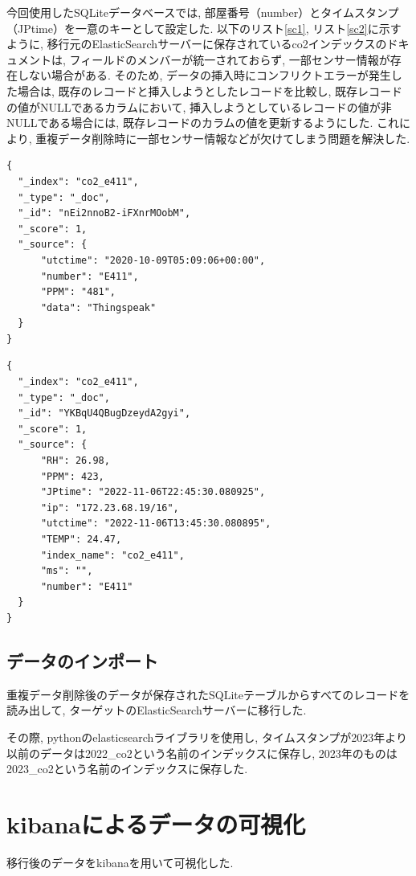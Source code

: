 今回使用したSQLiteデータベースでは, 部屋番号（number）とタイムスタンプ（JPtime）を一意のキーとして設定した. 以下のリスト\ref{sc1}, リスト\ref{sc2}に示すように, 移行元のElasticSearchサーバーに保存されているco2インデックスのドキュメントは, フィールドのメンバーが統一されておらず, 一部センサー情報が存在しない場合がある. そのため, データの挿入時にコンフリクトエラーが発生した場合は, 既存のレコードと挿入しようとしたレコードを比較し, 既存レコードの値がNULLであるカラムにおいて, 挿入しようとしているレコードの値が非NULLである場合には, 既存レコードのカラムの値を更新するようにした. これにより, 重複データ削除時に一部センサー情報などが欠けてしまう問題を解決した.

\begin{lstlisting}[caption=\_sourceフィールドのメンバー数が少ないドキュメント, label=sc1]
{
  "_index": "co2_e411",
  "_type": "_doc",
  "_id": "nEi2nnoB2-iFXnrMOobM",
  "_score": 1,
  "_source": {
      "utctime": "2020-10-09T05:09:06+00:00",
      "number": "E411",
      "PPM": "481",
      "data": "Thingspeak"
  }
}
  \end{lstlisting}

\begin{lstlisting}[caption=\_sourceフィールドのメンバー数が多いドキュメント, label=sc2]
{
  "_index": "co2_e411",
  "_type": "_doc",
  "_id": "YKBqU4QBugDzeydA2gyi",
  "_score": 1,
  "_source": {
      "RH": 26.98,
      "PPM": 423,
      "JPtime": "2022-11-06T22:45:30.080925",
      "ip": "172.23.68.19/16",
      "utctime": "2022-11-06T13:45:30.080895",
      "TEMP": 24.47,
      "index_name": "co2_e411",
      "ms": "",
      "number": "E411"
  }
}
    \end{lstlisting}

\subsection{データのインポート}
重複データ削除後のデータが保存されたSQLiteテーブルからすべてのレコードを読み出して, ターゲットのElasticSearchサーバーに移行した.

その際, pythonのelasticsearchライブラリを使用し, タイムスタンプが2023年より以前のデータは2022\_co2という名前のインデックスに保存し, 2023年のものは2023\_co2という名前のインデックスに保存した.

\section{kibanaによるデータの可視化}

移行後のデータをkibanaを用いて可視化した.

